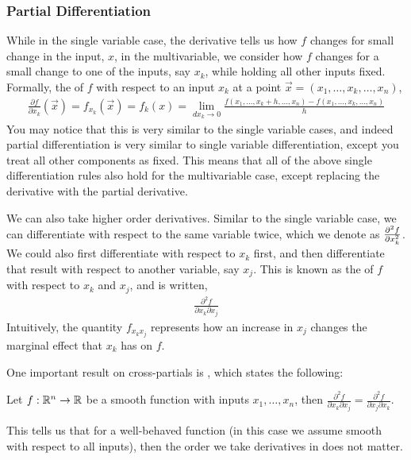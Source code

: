 \subsubsection*{Partial Differentiation}
While in the single variable case, the derivative tells us how $f$ changes for small change in the input, $x$, in the multivariable, we consider how $f$ changes for a small change to one of the inputs, say $x_k$, while holding all other inputs fixed. Formally, the  of $f$ with respect to an input $x_k$ at a point $\vec{x} = (x_1, \dots, x_k, \dots, x_n)$,
\begin{align*}
    \frac{\partial f}{\partial x_k}(\vec{x}) = f_{x_k}(\vec{x}) = f_k(x) = \lim_{dx_k \to 0} \frac{f(x_1, \dots, x_k + h, \dots, x_n) - f(x_1, \dots, x_k, \dots, x_n)}{h}
\end{align*}
You may notice that this is very similar to the single variable cases, and indeed partial differentiation is very similar to single variable differentiation, except you treat all other components as fixed. This means that all of the above single differentiation rules also hold for the multivariable case, except replacing the derivative with the partial derivative. 

We can also take higher order derivatives. Similar to the single variable case, we can differentiate with respect to the same variable twice, which we denote as $\frac{\partial ^2 f}{\partial x_k^2}$. We could also first differentiate with respect to $x_k$ first, and then differentiate that result with respect to another variable, say $x_j$. This is known as the  of $f$ with respect to $x_k$ and $x_j$, and is written,
\begin{align*}
    \frac{\partial^2 f}{\partial x_k \partial x_j}
\end{align*}
Intuitively, the quantity $f_{x_k x_j}$ represents how an increase in $x_j$ changes the marginal effect that $x_k$ has on $f$.

One important result on cross-partials is , which states the following:
\begin{theorem*}[Young] \label{thm:young}
    Let $f: \mathbb{R}^n \to \mathbb{R}$ be a smooth function with inputs $x_1, \dots, x_n$, then $\frac{\partial^2 f}{\partial x_k \partial x_j} = \frac{\partial^2 f}{\partial x_j \partial x_k}$. 
\end{theorem*}
This tells us that for a well-behaved function (in this case we assume smooth with respect to all inputs), then the order we take derivatives in does not matter. 


